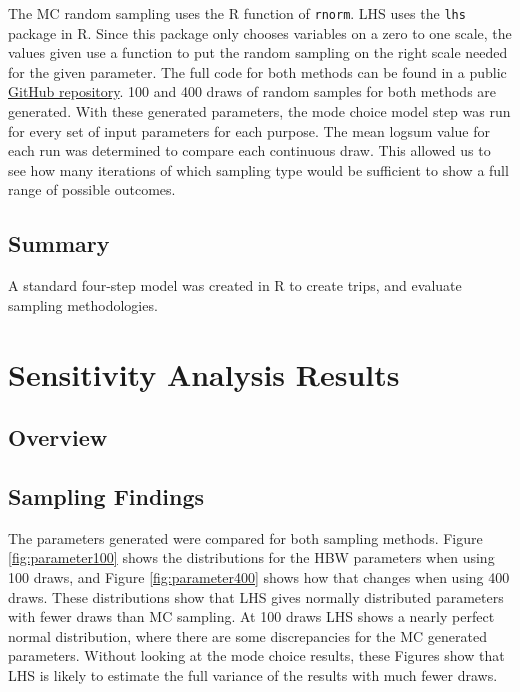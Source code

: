 \documentclass[fancy, masters,twoside]{byuthesis}
\begin{document}
The MC random sampling uses the R function of \texttt{rnorm}. LHS uses the \texttt{lhs} package in R. Since this package only chooses variables on a zero to one scale, the values given use a function to put the random sampling on the right scale needed for the given parameter. The full code for both methods can be found in a public \href{https://github.com/natmaegray/sensitivity_thesis}{GitHub repository}. 100 and 400 draws of random samples for both methods are generated. With these generated parameters, the mode choice model step was run for every set of input parameters for each purpose. The mean logsum value for each run was determined to compare each continuous draw. This allowed us to see how many iterations of which sampling type would be sufficient to show a full range of possible outcomes.

\hypertarget{summary-1}{%
\section{Summary}\label{summary-1}}

A standard four-step model was created in R to create trips, and evaluate sampling methodologies.

\hypertarget{sensitivity-analysis-results}{%
\chapter{Sensitivity Analysis Results}\label{sensitivity-analysis-results}}

\hypertarget{overview-2}{%
\section{Overview}\label{overview-2}}

\hypertarget{sampling-findings}{%
\section{Sampling Findings}\label{sampling-findings}}

The parameters generated were compared for both sampling methods. Figure \ref{fig:parameter100} shows the distributions for the HBW parameters when using 100 draws, and Figure \ref{fig:parameter400} shows how that changes when using 400 draws. These distributions show that LHS gives normally distributed parameters with fewer draws than MC sampling. At 100 draws LHS shows a nearly perfect normal distribution, where there are some discrepancies for the MC generated parameters. Without looking at the mode choice results, these Figures show that LHS is likely to estimate the full variance of the results with much fewer draws.
\end{document}
